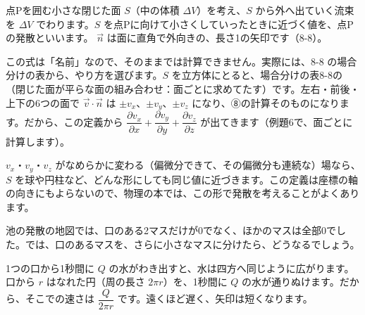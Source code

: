 \begin{seikaku}
点Pを囲む小さな閉じた面 $S$（中の体積 $\Delta V$）を考え、$S$ から外へ出ていく流束を $\Delta V$ でわります。$S$ を点Pに向けて小さくしていったときに近づく値を、点Pの発散といいます。
$\vec n$ は面に直角で外向きの、長さ1の矢印です（8-8）。

この式は「名前」なので、そのままでは計算できません。実際には、8-8 の場合分けの表から、やり方を選びます。$S$ を立方体にとると、場合分けの表8-8の （閉じた面が平らな面の組み合わせ：面ごとに求めてたす）です。左右・前後・上下の6つの面で $\vec v\cdot\vec n$ は $\pm v_x$、$\pm v_y$、$\pm v_z$ になり、⑧の計算そのものになります。だから、この定義から $\dfrac{\partial v_x}{\partial x}+\dfrac{\partial v_y}{\partial y}+\dfrac{\partial v_z}{\partial z}$ が出てきます（例題6で、面ごとに計算します）。

$v_x$・$v_y$・$v_z$ がなめらかに変わる（偏微分できて、その偏微分も連続な）場なら、$S$ を球や円柱など、どんな形にしても同じ値に近づきます。この定義は座標の軸の向きにもよらないので、物理の本では、この形で発散を考えることがよくあります。
\end{seikaku}


\label{bk:8-9:ten}池の発散の地図では、口のある2マスだけが0でなく、ほかのマスは全部0でした。では、口のあるマスを、さらに小さなマスに分けたら、どうなるでしょう。

\begin{bkfigure}
\begin{minipage}[c]{0.44\linewidth}\centering
{}
\end{minipage}\hfill
\begin{minipage}[c]{0.53\linewidth}
\raggedright
1つの口から1秒間に $Q$ の水がわき出すと、水は四方へ同じように広がります。口から $r$ はなれた円（周の長さ $2\pi r$）を、1秒間に $Q$ の水が通りぬけます。だから、そこでの速さは $\dfrac{Q}{2\pi r}$ です。遠くほど遅く、矢印は短くなります。
\end{minipage}
\label{bk:8-9:fig-ten}
\end{bkfigure}

